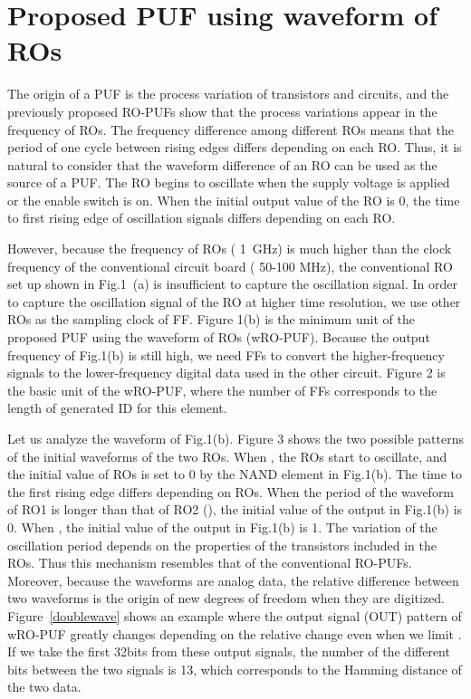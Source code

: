 ﻿\documentclass[aps,preprint,prb,superscriptaddress,amsmath,showpacs,tightenlines]{revtex4}
\begin{document}
\section{Proposed PUF using waveform of ROs}
The origin of a PUF is the process variation of transistors and circuits, 
and the previously proposed RO-PUFs show that
the process variations appear in the frequency of ROs.
The frequency difference among different ROs 
means that the period of one cycle between rising edges 
differs depending on each RO. 
Thus, it is natural to consider that the waveform difference of an RO
can be used as the source of a PUF.
The RO begins to oscillate when the supply voltage is applied
or the enable switch is on.
When the initial output value of the RO is 0, 
the time to first rising edge of oscillation signals differs
depending on each RO.

However, because the frequency of ROs ( 1~GHz) 
is much higher than the clock frequency of the conventional circuit board ( 50-100 MHz),
the conventional RO set up shown in Fig.1~(a) is insufficient to 
capture the oscillation signal.
In order to capture the oscillation signal of the RO at higher time resolution, 
we use other ROs as the sampling clock of FF.
Figure 1(b) is the minimum unit of the proposed PUF using the waveform of ROs (wRO-PUF).
Because the output frequency of Fig.1(b) is still high,
we need FFs to convert the higher-frequency signals to the lower-frequency digital data
 used in the other circuit.
Figure 2 is the basic unit of the wRO-PUF, 
where the number of FFs corresponds to the length of 
generated ID for this element.


Let us analyze the waveform of Fig.1(b).
Figure 3 shows the two possible patterns of the initial waveforms of the 
two ROs.
When , the ROs start to oscillate, and 
the initial value of ROs is set to 0 by the NAND element in Fig.1(b).
The time to the first rising edge differs depending on ROs.
When the period of the waveform of RO1 is longer than that of RO2 (),
the initial value of the output in Fig.1(b) is 0.
When , the initial value of the output in Fig.1(b) is 1. 
The variation of the oscillation period depends on the properties of the transistors 
included in the ROs. Thus this mechanism resembles that of the conventional RO-PUFs.
Moreover, because the waveforms are analog data, 
the relative difference  between two waveforms is the origin of
new degrees of freedom when they are digitized.
Figure~\ref{doublewave} shows an example where the output signal (OUT) pattern of wRO-PUF greatly changes 
depending on the relative change  even when we limit .
If we take the first 32bits from these output signals, 
the number of the different bits between the two signals is 13,
which corresponds to the Hamming distance of the two data.
\end{document}
